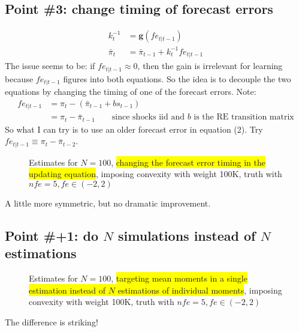 \documentclass[11pt]{article}
\def \myFigPath {../../figures/}
\renewcommand{\[}{\begin{equation}}
\renewcommand{\]}{\end{equation}}
\def\mySmallerFigScale{0.18}
\def\myTinyFigScale{0.16}
\begin{document}
\subsection*{Point \#3:  change timing of forecast errors}
\begin{align}
k_t^{-1} &= \mathbf{g}(fe_{t|t-1}) \label{gaineq}\\
\bar{\pi}_t &= \bar{\pi}_{t-1} + k_t^{-1}fe_{t|t-1} \label{pibeq}
\end{align}
The issue 	seems to be: if $fe_{t|t-1} \approx 0$, then the gain is irrelevant for learning because $fe_{t|t-1}$ figures into both equations. So the idea is to decouple the two equations by changing the timing of one of the forecast errors. Note:
\begin{align}
fe_{t|t-1} &= \pi_t - (\bar{\pi}_{t-1}+bs_{t-1})\\
&= \pi_t - \bar{\pi}_{t-1} \quad \quad \text{since shocks iid and $b$ is the RE transition matrix}
\end{align}
So what I can try is to use an older forecast error in equation (2). Try $fe_{t|t-1}\equiv \pi_t - \bar{\pi}_{t-2}$.
\begin{figure}[h!]
\hfill
{}
\caption{Estimates for $N=100$, \colorbox{yellow}{changing the forecast error timing in the updating equation}, imposing convexity with weight 100K, truth with $nfe=5, fe \in(-2,2)$}
\end{figure}

A little more symmetric, but no dramatic improvement. 


\newpage
\subsection*{Point \#+1: do $N$ simulations instead of $N$ estimations}
\begin{figure}[h!]
\hfill
{}
\caption{Estimates for $N=100$, \colorbox{yellow}{targeting mean moments in a single estimation instead of $N$ estimations of individual moments}, imposing convexity with weight 100K, truth with $nfe=5, fe \in(-2,2)$}
\end{figure}
The difference is striking!
\end{document}

